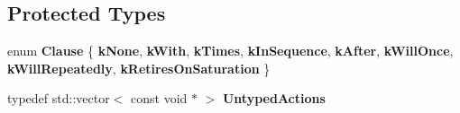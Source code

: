 \subsection*{Protected Types}
\begin{DoxyCompactItemize}
\item 
\mbox{\label{classtesting_1_1internal_1_1_expectation_base_a450f34b979ec5814c91d4eab6b78cfc2}} 
enum {\bfseries Clause} \{ \newline
{\bfseries k\+None}, 
{\bfseries k\+With}, 
{\bfseries k\+Times}, 
{\bfseries k\+In\+Sequence}, 
\newline
{\bfseries k\+After}, 
{\bfseries k\+Will\+Once}, 
{\bfseries k\+Will\+Repeatedly}, 
{\bfseries k\+Retires\+On\+Saturation}
 \}
\item 
\mbox{\label{classtesting_1_1internal_1_1_expectation_base_a9b21e82059961b9f1198d3f5d518254f}} 
typedef std\+::vector$<$ const void $\ast$ $>$ {\bfseries Untyped\+Actions}
\end{DoxyCompactItemize}
